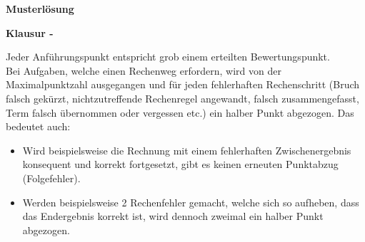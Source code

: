 \begin{center}
{\bf {\large Musterlösung}}
\end{center}

\begin{center}
{\bf {\large Klausur \submodule - \examdate}}
\end{center}

Jeder Anführungspunkt entspricht grob einem erteilten Bewertungspunkt. \\

Bei Aufgaben, welche einen Rechenweg erfordern, wird von der Maximalpunktzahl ausgegangen und für jeden fehlerhaften Rechenschritt (Bruch falsch gekürzt, nichtzutreffende Rechenregel angewandt, falsch zusammengefasst, Term falsch übernommen oder vergessen etc.) ein halber Punkt abgezogen. Das bedeutet auch:

\begin{itemize}
	\item Wird beispielsweise die Rechnung mit einem fehlerhaften Zwischenergebnis konsequent und korrekt fortgesetzt, gibt es keinen erneuten Punktabzug (Folgefehler).
	\item Werden beispielsweise 2 Rechenfehler gemacht, welche sich so aufheben, dass das Endergebnis korrekt ist, wird dennoch zweimal ein halber Punkt abgezogen.
\end{itemize}
